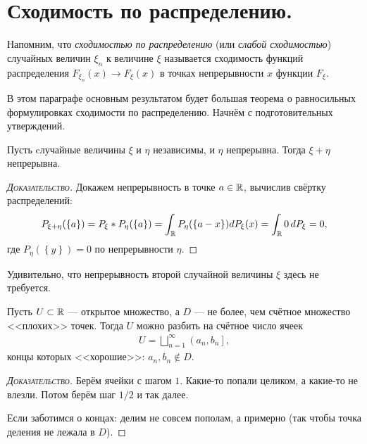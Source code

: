 \documentclass[../main.tex]{subfiles}
\begin{document}
\newpage
\section{Сходимость по распределению.}

Напомним, что \textit{сходимостью по распределению} (или \textit{слабой сходимостью}) случайных величин $ \xi_n $ к величине $ \xi $ называется сходимость функций распределения $ F_{\xi_n}(x) \to F_\xi(x) $ в точках непрерывности $ x $ функции $ F_\xi $.

В этом параграфе основным результатом будет большая теорема о равносильных формулировках сходимости по распределению. Начнём с подготовительных утверждений.

\begin{remrk}
 \label{remark:sum_with_continuous_rv_is_continuous}
 Пусть cлучайные величины $ \xi $ и $ \eta $ независимы, и $ \eta $ непрерывна. Тогда $ \xi + \eta $ непрерывна.
\end{remrk}
\begin{proof}[\normalfont\textsc{Доказательство}]
 Докажем непрерывность в точке $ a \in \mathbb{R} $, вычислив свёртку распределений:
 \begin{align*}
  P_{\xi+\eta}(\left\{ a \right\}) = P_\xi \ast P_\eta(\left\{ a \right\}) = \int_{\mathbb{R}} P_{\eta}(\left\{ a-x \right\}) dP_\xi(x) = \int_{\mathbb{R}} 0\,dP_\xi = 0, 
 \end{align*} где $ P_\eta(\left\{ y \right\}) = 0 $ по непрерывности $ \eta $.
\end{proof}

Удивительно, что непрерывность второй случайной величины $ \xi $ здесь не требуется.

\begin{remrk}
 \label{remark:open_set_partitioned_into_cells_with_countable_bad_points}
 Пусть $ U \subset \mathbb{R} $ --- открытое множество, а $ D $  --- не более, чем счётное множество <<плохих>> точек. Тогда $ U $ можно разбить на счётное число ячеек
 \begin{align*}
  U = \bigsqcup_{n=1}^{\infty} \left(a_n, b_n\right],
 \end{align*} концы которых <<хорошие>>: $ a_n, b_n \notin D $.
\end{remrk}
\begin{proof}[\normalfont\textsc{Доказательство}]
 Берём ячейки с шагом $ 1 $. Какие-то попали целиком, а какие-то не влезли. Потом берём шаг $ 1 / 2 $ и так далее.

 Если заботимся о концах: делим не совсем пополам, а примерно (так чтобы точка деления не лежала в $ D $).
\end{proof}
\end{document}
